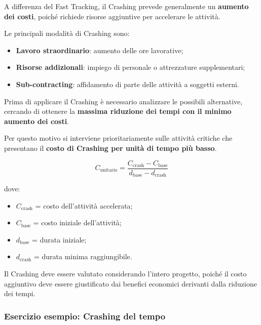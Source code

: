 \medskip

\noindent A differenza del Fast Tracking, il Crashing
prevede generalmente un \textbf{aumento dei costi},
poiché richiede risorse aggiuntive per accelerare le attività.

\medskip

\noindent Le principali modalità di Crashing sono:

\begin{itemize}
    \item \textbf{Lavoro straordinario}: aumento delle ore lavorative;

    \item \textbf{Risorse addizionali}: impiego di personale
    o attrezzature supplementari;

    \item \textbf{Sub-contracting}: affidamento di parte
    delle attività a soggetti esterni.
\end{itemize}

\noindent Prima di applicare il Crashing è necessario
analizzare le possibili alternative, cercando di ottenere
la \textbf{massima riduzione dei tempi con il minimo
aumento dei costi}.

\medskip

\noindent Per questo motivo si interviene prioritariamente
sulle attività critiche che presentano il
\textbf{costo di Crashing per unità di tempo più basso}.

\[
\boxed{
C_{\text{unitario}}=
\frac{C_{\text{crash}}-C_{\text{base}}}
{d_{\text{base}}-d_{\text{crash}}}
}
\]

\noindent dove:

\begin{itemize}
    \item $C_{\text{crash}}$ = costo dell'attività accelerata;
    \item $C_{\text{base}}$ = costo iniziale dell'attività;
    \item $d_{\text{base}}$ = durata iniziale;
    \item $d_{\text{crash}}$ = durata minima raggiungibile.
\end{itemize}

\noindent Il Crashing deve essere valutato considerando
l'intero progetto, poiché il costo aggiuntivo deve essere
giustificato dai benefici economici derivanti
dalla riduzione dei tempi.


\subsubsection*{Esercizio esempio: Crashing del tempo}

